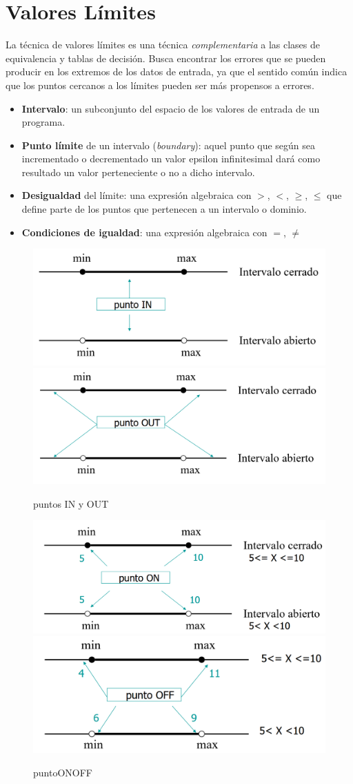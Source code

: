 \section{Valores Límites}
La técnica de valores límites es una técnica \textit{complementaria} a las clases de equivalencia y tablas de decisión.
Busca encontrar los errores que se pueden producir en los extremos de los datos de entrada, ya que el sentido común indica que los puntos cercanos a los límites pueden ser más propensos a errores.
\begin{itemize}
	\item \textbf{Intervalo}: un subconjunto del espacio de los valores de entrada de
un programa.
	\item \textbf{Punto límite} de un intervalo (\textit{boundary}): aquel punto que según
sea incrementado o decrementado un valor epsilon infinitesimal
dará como resultado un valor perteneciente o no a dicho intervalo.
	\item \textbf{Desigualdad} del límite: una expresión algebraica con $>$, $<$, $\geq$, $\leq$
que define parte de los puntos que pertenecen a un intervalo o
dominio.
	\item \textbf{Condiciones de igualdad}: una expresión algebraica con $=$, $\neq$
\end{itemize}

\begin{figure}[htbp]
   \centering
   \includegraphics[width=0.45\columnwidth]{images/05/puntoIN.png}
   \includegraphics[width=0.45\columnwidth]{images/05/puntoOUT.png}
   \caption{puntos IN y OUT}
   \label{fig:05/puntoINOUT}
\end{figure}
\begin{figure}[htbp]
   \centering
   \includegraphics[width=0.45\columnwidth]{images/05/puntoON.png}
   \includegraphics[width=0.45\columnwidth]{images/05/puntoOFF.png}
   \caption{puntoONOFF}
   \label{fig:05/puntoONOFF}
\end{figure}

